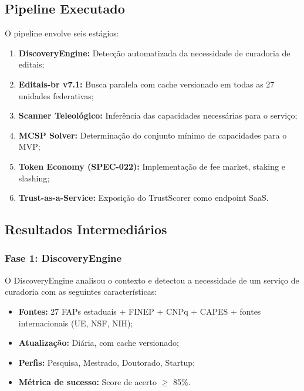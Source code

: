\subsection{Pipeline Executado}

O pipeline envolve seis
estágios:

\begin{enumerate}
    \item \textbf{DiscoveryEngine:} Detecção automatizada da
          necessidade de curadoria de editais;
    \item \textbf{Editais-br v7.1:} Busca paralela com cache
          versionado em todas as 27 unidades federativas;
    \item \textbf{Scanner Teleológico:} Inferência das capacidades
          necessárias para o serviço;
    \item \textbf{MCSP Solver:} Determinação do conjunto mínimo de
          capacidades para o MVP;
    \item \textbf{Token Economy (SPEC-022):} Implementação de fee
          market, staking e slashing;
    \item \textbf{Trust-as-a-Service:} Exposição do TrustScorer como
          endpoint SaaS.
\end{enumerate}

\subsection{Resultados Intermediários}

\subsubsection{Fase 1: DiscoveryEngine}

O DiscoveryEngine analisou o contexto e detectou a necessidade de
um serviço de curadoria com as seguintes características:

\begin{itemize}
    \item \textbf{Fontes:} 27 FAPs estaduais + FINEP + CNPq + CAPES
          + fontes internacionais (UE, NSF, NIH);
    \item \textbf{Atualização:} Diária, com cache versionado;
    \item \textbf{Perfis:} Pesquisa, Mestrado, Doutorado, Startup;
    \item \textbf{Métrica de sucesso:} Score de acerto $\ge$ 85\%.
\end{itemize}


